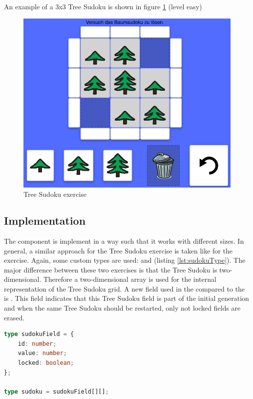 \begin{example}
    An example of a 3x3 Tree Sudoku is shown in figure \ref{fig:tree_sudoku_example_exercise} (level easy)
\end{example}

\begin{figure} 
    \centering
    \includegraphics[width=0.6 \columnwidth]{figures/tree_sudoku_example_exercise.png}
    \caption{Tree Sudoku exercise} 
    \label{fig:tree_sudoku_example_exercise} 
\end{figure}

\subsection{Implementation}

The  component is implement in a way such that it works with different sizes. In general, a similar approach for the Tree Sudoku exercise is taken like for the  exercise. Again, some custom types are used:  and  (listing \ref{lst:sudokuType}). The major difference between these two exercises is that the Tree Sudoku is two-dimensional. Therefore a two-dimensional array is used for the internal representation of the Tree Sudoku grid. A new field used in the  compared to the  is . This field indicates that this Tree Sudoku field is part of the initial generation and when the same Tree Sudoku should be restarted, only not locked fields are erased.

\begin{lstlisting}[language=TypeScript,caption={Definition of the custom sudoku and sudokuField type},label={lst:sudokuType}]
type sudokuField = {
    id: number;
    value: number;
    locked: boolean;
};

type sudoku = sudokuField[][];
\end{lstlisting}

